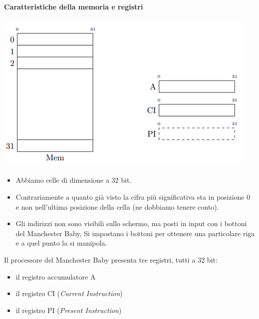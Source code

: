 \documentclass[11pt]{report}
\theoremstyle{definition}
\begin{document}
\paragraph{Caratteristiche della memoria e registri}
\begin{center}
\includegraphics{img/4.PNG}
\end{center}
\begin{itemize}
\item Abbiamo celle di dimensione a 32 bit. 
\item Contrariamente a quanto già visto la cifra più significativa sta in posizione 0 e non nell'ultima posizione della cella (ne dobbiamo tenere conto).
\item Gli indirizzi non sono visibili sullo schermo, ma posti in input con i bottoni del Manchester Baby, Si impostano i bottoni per ottenere una particolare riga e a quel punto la si manipola.
\end{itemize}
Il processore del Manchester Baby presenta tre registri, tutti a 32 bit:
\begin{itemize}
\item il registro accumulatore A
\item il registro CI (\emph{Current Instruction})
\item il registro PI (\emph{Present Instruction})
\end{itemize}
\end{document}
